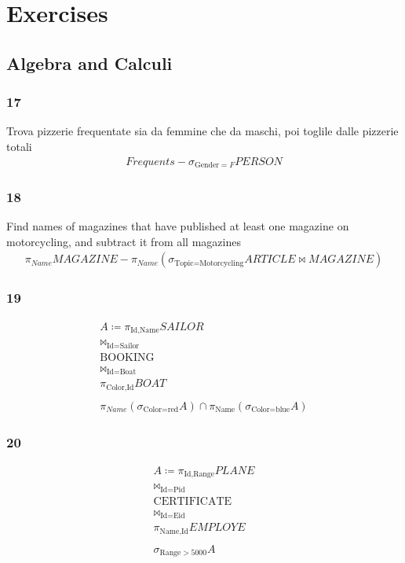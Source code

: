 % 
  \chapter{Exercises}
  \section{Algebra and Calculi}
  \subsection{17}
  Trova pizzerie frequentate sia da femmine che da maschi, poi toglile dalle pizzerie totali
  \begin{align*}
    Frequents - \sigma_{\text{Gender}=F}PERSON 
  \end{align*}
  \subsection{18}
  Find names of magazines that have published at least one magazine on motorcycling, and subtract it from all magazines
  \begin{align*}
    \pi_{Name}MAGAZINE - \pi_{Name}(\sigma_{\text{Topic}=\text{Motorcycling}}ARTICLE \Join MAGAZINE)
  \end{align*}
  \subsection{19}
  \begin{align*}
    A \coloneq \pi_{\text{Id}, \text{Name}}SAILOR\\
    \Join_{\text{Id}=\text{Sailor}}\\
  \text{BOOKING}\\
    \Join_{\text{Id}=\text{Boat}}\\
  \pi_{\text{Color}, \text{Id}}BOAT\\
    \\
    \pi_{Name}(\sigma_{\text{Color}=\text{red}}A) \cap \pi_{\text{Name}}(\sigma_{\text{Color}=\text{blue}}A)
  \end{align*}
  \subsection{20}
  \begin{align*}
    A \coloneq \pi_{\text{Id}, \text{Range}}PLANE\\
    \Join_{\text{Id}=\text{Pid}}\\
  \text{CERTIFICATE}\\
    \Join_{\text{Id}=\text{Eid}}\\
  \pi_{\text{Name}, \text{Id}}EMPLOYE\\
    \\
  \sigma_{\text{Range} > 5000}A
  \end{align*}
% 
